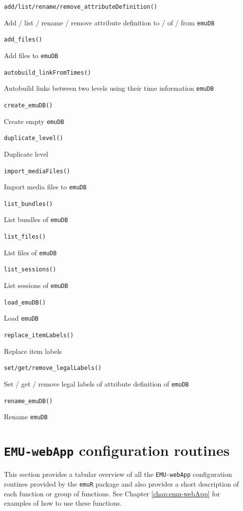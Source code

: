 \documentclass[]{book}
\begin{document}
\texttt{add/list/rename/remove\_attributeDefinition()}

Add / list / rename / remove attribute definition to / of / from \texttt{emuDB}

\texttt{add\_files()}

Add files to \texttt{emuDB}

\texttt{autobuild\_linkFromTimes()}

Autobuild links between two levels using their time information \texttt{emuDB}

\texttt{create\_emuDB()}

Create empty \texttt{emuDB}

\texttt{duplicate\_level()}

Duplicate level

\texttt{import\_mediaFiles()}

Import media files to \texttt{emuDB}

\texttt{list\_bundles()}

List bundles of \texttt{emuDB}

\texttt{list\_files()}

List files of \texttt{emuDB}

\texttt{list\_sessions()}

List sessions of \texttt{emuDB}

\texttt{load\_emuDB()}

Load \texttt{emuDB}

\texttt{replace\_itemLabels()}

Replace item labels

\texttt{set/get/remove\_legalLabels()}

Set / get / remove legal labels of attribute definition of \texttt{emuDB}

\texttt{rename\_emuDB()}

Rename \texttt{emuDB}

\hypertarget{sec:emuRpackageDetails-emuWebAppConfig}{%
\section{\texorpdfstring{\texttt{EMU-webApp} configuration routines}{EMU-webApp configuration routines}}\label{sec:emuRpackageDetails-emuWebAppConfig}}

This section provides a tabular overview of all the \texttt{EMU-webApp} configuration routines provided by the \texttt{emuR} package and also provides a short description of each function or group of functions. See Chapter \ref{chap:emu-webApp} for examples of how to use these functions.
\end{document}
